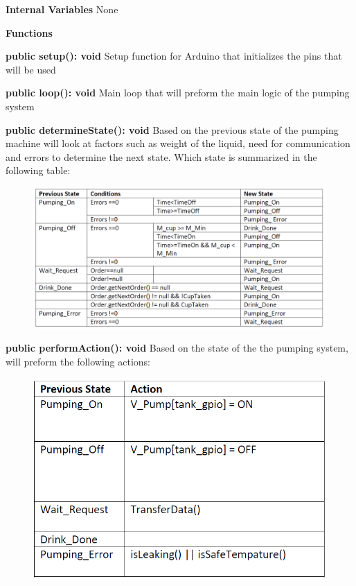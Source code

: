 \documentclass [10pt]{article}
\begin{document}
\textbf{Internal Variables}
 None

\textbf{Functions}

\textbf{public setup(): void}
Setup function for Arduino that initializes the pins that will be used 

\textbf{public loop(): void}
Main loop that will preform the main logic of the pumping system

\textbf{public determineState(): void}
Based on the previous state of the pumping machine will look at factors such as weight of the liquid, need for communication and errors to determine the next state. Which state is summarized in the following table:
\begin{figure} [h!]
	\centering
	\includegraphics [scale = 0.4] {figures/Pumping_DetermineState.png}
\end{figure}

\textbf{public performAction(): void}
Based on the state of the the pumping system, will preform the following actions:
\begin{figure} [h!]
	\centering
	\includegraphics [scale = 0.4] {figures/Pumping_PerformActions.png}
\end{figure}
\end{document}
